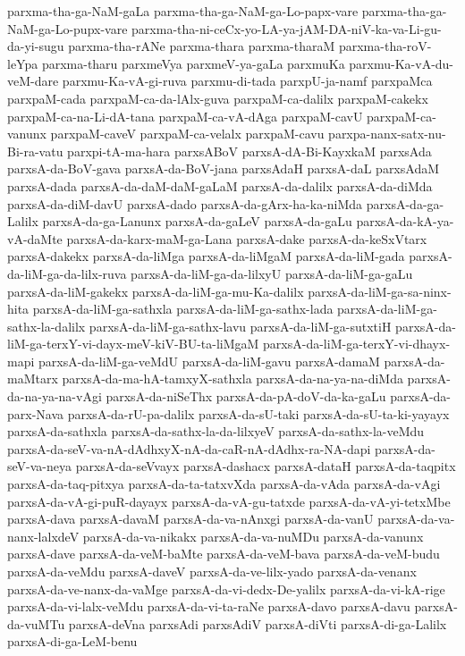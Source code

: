 {parxma-tha-ga-NaM-gaLa
parxma-tha-ga-NaM-ga-Lo-papx-vare
parxma-tha-ga-NaM-ga-Lo-pupx-vare
parxma-tha-ni-ceCx-yo-LA-ya-jAM-DA-niV-ka-va-Li-gu-da-yi-sugu
parxma-tha-rANe
parxma-thara
parxma-tharaM
parxma-tha-roV-leYpa
parxma-tharu
parxmeVya
parxmeV-ya-gaLa
parxmuKa
parxmu-Ka-vA-du-veM-dare
parxmu-Ka-vA-gi-ruva
parxmu-di-tada
parxpU-ja-namf
parxpaMca
parxpaM-cada
parxpaM-ca-da-lAlx-guva
parxpaM-ca-dalilx
parxpaM-cakekx
parxpaM-ca-na-Li-dA-tana
parxpaM-ca-vA-dAga
parxpaM-cavU
parxpaM-ca-vanunx
parxpaM-caveV
parxpaM-ca-velalx
parxpaM-cavu
parxpa-nanx-satx-nu-Bi-ra-vatu
parxpi-tA-ma-hara
parxsABoV
parxsA-dA-Bi-KayxkaM
parxsAda
parxsA-da-BoV-gava
parxsA-da-BoV-jana
parxsAdaH
parxsA-daL
parxsAdaM
parxsA-dada
parxsA-da-daM-daM-gaLaM
parxsA-da-dalilx
parxsA-da-diMda
parxsA-da-diM-davU
parxsA-dado
parxsA-da-gArx-ha-ka-niMda
parxsA-da-ga-Lalilx
parxsA-da-ga-Lanunx
parxsA-da-gaLeV
parxsA-da-gaLu
parxsA-da-kA-ya-vA-daMte
parxsA-da-karx-maM-ga-Lana
parxsA-dake
parxsA-da-keSxVtarx
parxsA-dakekx
parxsA-da-liMga
parxsA-da-liMgaM
parxsA-da-liM-gada
parxsA-da-liM-ga-da-lilx-ruva
parxsA-da-liM-ga-da-lilxyU
parxsA-da-liM-ga-gaLu
parxsA-da-liM-gakekx
parxsA-da-liM-ga-mu-Ka-dalilx
parxsA-da-liM-ga-sa-ninx-hita
parxsA-da-liM-ga-sathxla
parxsA-da-liM-ga-sathx-lada
parxsA-da-liM-ga-sathx-la-dalilx
parxsA-da-liM-ga-sathx-lavu
parxsA-da-liM-ga-sutxtiH
parxsA-da-liM-ga-terxY-vi-dayx-meV-kiV-BU-ta-liMgaM
parxsA-da-liM-ga-terxY-vi-dhayx-mapi
parxsA-da-liM-ga-veMdU
parxsA-da-liM-gavu
parxsA-damaM
parxsA-da-maMtarx
parxsA-da-ma-hA-tamxyX-sathxla
parxsA-da-na-ya-na-diMda
parxsA-da-na-ya-na-vAgi
parxsA-da-niSeThx
parxsA-da-pA-doV-da-ka-gaLu
parxsA-da-parx-Nava
parxsA-da-rU-pa-dalilx
parxsA-da-sU-taki
parxsA-da-sU-ta-ki-yayayx
parxsA-da-sathxla
parxsA-da-sathx-la-da-lilxyeV
parxsA-da-sathx-la-veMdu
parxsA-da-seV-va-nA-dAdhxyX-nA-da-caR-nA-dAdhx-ra-NA-dapi
parxsA-da-seV-va-neya
parxsA-da-seVvayx
parxsA-dashacx
parxsA-dataH
parxsA-da-taqpitx
parxsA-da-taq-pitxya
parxsA-da-ta-tatxvXda
parxsA-da-vAda
parxsA-da-vAgi
parxsA-da-vA-gi-puR-dayayx
parxsA-da-vA-gu-tatxde
parxsA-da-vA-yi-tetxMbe
parxsA-dava
parxsA-davaM
parxsA-da-va-nAnxgi
parxsA-da-vanU
parxsA-da-va-nanx-lalxdeV
parxsA-da-va-nikakx
parxsA-da-va-nuMDu
parxsA-da-vanunx
parxsA-dave
parxsA-da-veM-baMte
parxsA-da-veM-bava
parxsA-da-veM-budu
parxsA-da-veMdu
parxsA-daveV
parxsA-da-ve-lilx-yado
parxsA-da-venanx
parxsA-da-ve-nanx-da-vaMge
parxsA-da-vi-dedx-De-yalilx
parxsA-da-vi-kA-rige
parxsA-da-vi-lalx-veMdu
parxsA-da-vi-ta-raNe
parxsA-davo
parxsA-davu
parxsA-da-vuMTu
parxsA-deVna
parxsAdi
parxsAdiV
parxsA-diVti
parxsA-di-ga-Lalilx
parxsA-di-ga-LeM-benu
}
